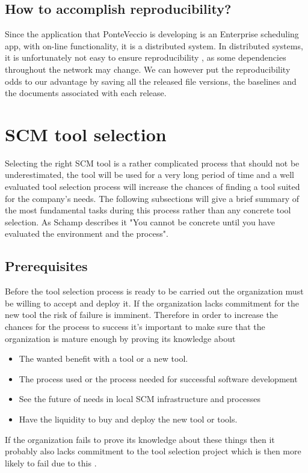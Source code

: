 \documentclass[10pt]{article}
\begin{document}
\subsection{How to accomplish reproducibility?}
\noindent Since the application that PonteVeccio is developing is an Enterprise scheduling app, with on-line functionality, it is a distributed system. In distributed systems, it is unfortunately not easy to ensure reproducibility \cite{Bays}, as some dependencies throughout the network may change. We can however put the reproducibility odds to our advantage by saving all the released file versions, the baselines and the documents associated with each release. 

\section{SCM tool selection}
Selecting the right SCM tool is a rather complicated process that should not be underestimated, the tool will be used for a very long period of time and a well evaluated tool selection process will increase the chances of finding a tool suited for the company's needs. The following subsections will give a brief summary of the most fundamental tasks during this process rather than any concrete tool selection. As Schamp \cite{Schamp} describes it
"You cannot be concrete until you have evaluated the environment and the process".

\subsection{Prerequisites}
Before the tool selection process is ready to be carried out the organization must be willing to accept and deploy it. If the organization lacks commitment for the new tool the risk of failure is imminent. Therefore in order to increase the chances for the process to success it's important to make sure that the organization is mature enough by proving its knowledge about 
\begin{itemize}
\item The wanted benefit with a tool or a new tool.
\item The process used or the process needed for successful software development
\item See the future of needs in local SCM infrastructure and processes
\item Have the liquidity to buy and deploy the new tool or tools.
\end{itemize}
If the organization fails to prove its knowledge about these things then it probably also lacks commitment to the tool selection project which is then more likely to fail due to this \cite{ABB}.
\end{document}
